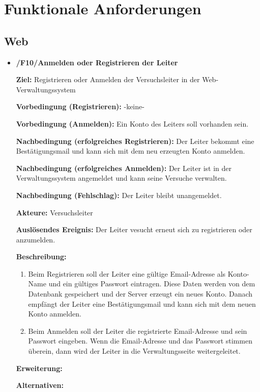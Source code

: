 \documentclass[a4paper]{scrreprt}
\begin{document}
    \chapter{Funktionale Anforderungen}

		\section{Web}
	        \begin{itemize}
	            \item \textbf{/F10/Anmelden oder Registrieren der Leiter}
		
	            	\par \textbf{Ziel: }Registrieren oder Anmelden der Versuchsleiter in der Web-Verwaltungssystem
	            	\par \textbf{Vorbedingung (Registrieren): }-keine-
	            	\par \textbf{Vorbedingung (Anmelden): }Ein Konto des Leiters soll vorhanden sein.
	            	\par \textbf{Nachbedingung (erfolgreiches Registrieren): }Der Leiter bekommt eine Bestätigungsmail und kann sich mit dem neu erzeugten Konto anmelden.
	            	\par \textbf{Nachbedingung (erfolgreiches Anmelden): }Der Leiter ist in der Verwaltungssystem angemeldet und kann seine Versuche verwalten.
	            	\par \textbf{Nachbedingung (Fehlschlag): }Der Leiter bleibt unangemeldet.
	            	\par \textbf{Akteure: }Versuchsleiter
	            	\par \textbf{Auslösendes Ereignis: }Der Leiter vesucht erneut sich zu registrieren oder anzumelden.
	            	\par \textbf{Beschreibung: }
		            	\begin{enumerate}
		            		\item Beim Registrieren soll der Leiter eine gültige Email-Adresse als Konto-Name und ein gültiges Passwort eintragen. Diese Daten werden von dem Datenbank gespeichert und der Server erzeugt ein neues Konto. Danach empfängt der Leiter eine Bestätigungsmail und kann sich mit dem neuen Konto anmelden.
			            	\item Beim Anmelden soll der Leiter die registrierte Email-Adresse und sein Passwort eingeben. Wenn die Email-Adresse und das Passwort stimmen überein, dann wird der Leiter in die Verwaltungsseite weitergeleitet.
		            	\end{enumerate}
	            	\par \textbf{Erweiterung: }
	            	\par \textbf{Alternativen: }
	            	

\end{itemize}
\end{document}
